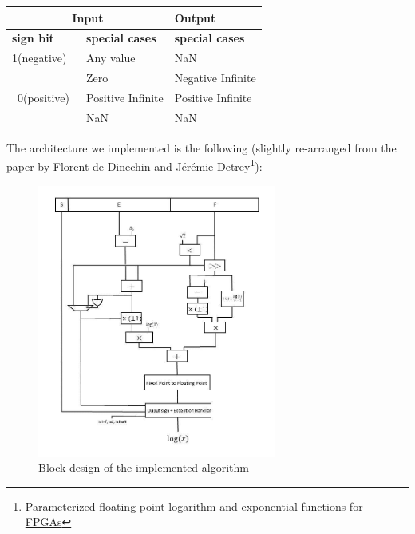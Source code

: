\documentclass{report}
\begin{document}
\begin{table}[ht]
\centering
\begin{tabular}{|l|l|l|} 
\hline
\multicolumn{2}{|c|}{\textbf{Input}}                                          & \textbf{Output}         \\ 
\hline
\textbf{sign bit}               & \multicolumn{1}{|l|}{\textbf{special cases}} & \textbf{special cases}  \\ 
\hline
1(negative)                     & Any value                                   & NaN                     \\ 
\cline{1-1}
\multirow{4}{*}{~0(positive)~} & Zero                                        & Negative Infinite       \\
                                & Positive Infinite                           & Positive Infinite       \\
                                & NaN                                         & NaN                     \\
\hline
\end{tabular}
\end{table}
\newpage
The architecture we implemented is the following (slightly re-arranged from the paper by Florent de Dinechin and J\'{e}r\'{e}mie Detrey\footnote{\href{https://hal-ens-lyon.archives-ouvertes.fr/ensl-00542213/file/DetreyDinechinJMM.pdf} {Parameterized floating-point logarithm and exponential functions for FPGAs} }):
\begin{figure}[h]
  \centering
    \includegraphics[width=0.7\textwidth]{images/block_diagram.jpg}
    \caption{Block design of the implemented algorithm}
\end{figure}
\end{document}
